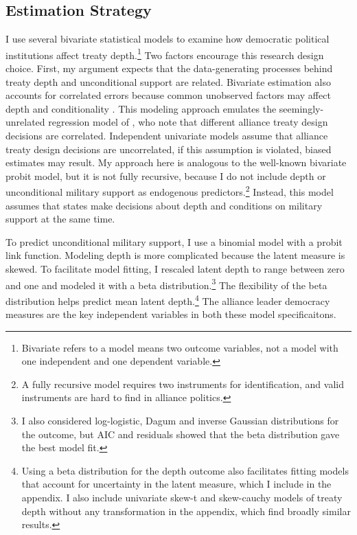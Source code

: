 \documentclass[12pt]{article}
\begin{document}
\subsection{Estimation Strategy}



I use several bivariate statistical models to examine how democratic political institutions affect treaty depth.\footnote{Bivariate refers to a model means two outcome variables, not a model with one independent and one dependent variable.} 
Two factors encourage this research design choice. 
First, my argument expects that the data-generating processes behind treaty depth and unconditional support are related. 
Bivariate estimation also accounts for correlated errors because common unobserved factors may affect depth and conditionality \citep{Braumoelleretal2018}.
This modeling approach emulates the seemingly-unrelated regression model of \citet{FjelstulReiter2019}, who note that different alliance treaty design decisions are correlated. 
Independent univariate models assume that alliance treaty design decisions are uncorrelated, if this assumption is violated, biased estimates may result. 
My approach here is analogous to the well-known bivariate probit model, but it is not fully recursive, because I do not include depth or unconditional military support as endogenous predictors.\footnote{A fully recursive model requires two instruments for identification, and valid instruments are hard to find in alliance politics.}  
Instead, this model assumes that states make decisions about depth and conditions on military support at the same time. 


To predict unconditional military support, I use a binomial model with a probit link function. 
Modeling depth is more complicated because the latent measure is skewed.
To facilitate model fitting, I rescaled latent depth to range between zero and one and modeled it with a beta distribution.\footnote{I also considered log-logistic, Dagum and inverse Gaussian distributions for the outcome, but AIC and residuals showed that the beta distribution gave the best model fit.}
The flexibility of the beta distribution helps predict mean latent depth.\footnote{Using a beta distribution for the depth outcome also facilitates fitting models that account for uncertainty in the latent measure, which I include in the appendix. I also include univariate skew-t and skew-cauchy models of treaty depth without any transformation in the appendix, which find broadly similar results.} 
The alliance leader democracy measures are the key independent variables in both these model specificaitons. 
\end{document}
